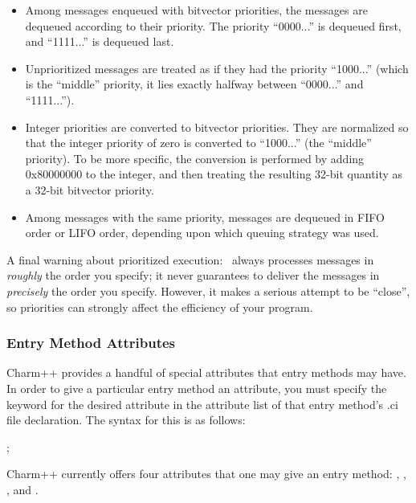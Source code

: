 \begin{itemize}

\item Among messages enqueued with bitvector priorities, the
messages are dequeued according to their priority.  The
priority ``0000...'' is dequeued first, and ``1111...'' is
dequeued last.

\item Unprioritized messages are treated as if they had the
priority ``1000...'' (which is the ``middle'' priority, it
lies exactly halfway between ``0000...'' and ``1111...'').
 
\item Integer priorities are converted to bitvector priorities.  They
are normalized so that the integer priority of zero is converted to
``1000...'' (the ``middle'' priority).  To be more specific, the
conversion is performed by adding 0x80000000 to the integer, and then
treating the resulting 32-bit quantity as a 32-bit bitvector priority.

\item Among messages with the same priority, messages are
dequeued in FIFO order or LIFO order, depending upon which
queuing strategy was used.

\end{itemize} 

A final warning about prioritized execution: \charmpp\ always processes
messages in {\it roughly} the order you specify; it never guarantees to
deliver the messages in {\it precisely} the order you specify.
However, it makes a serious attempt to be ``close'', so priorities
can strongly affect the efficiency of your program.

\subsubsection{Entry Method Attributes}
\label{attributes}

Charm++ provides a handful of special attributes that entry
methods may have.  In order to give a particular entry
method an attribute, you must specify the keyword for the desired attribute in
the attribute list of that entry method's .ci file declaration.  The syntax for
this is as follows:

\small
{} ;
\normalsize

Charm++ currently offers four attributes that one may give an entry method:
, , , and .


